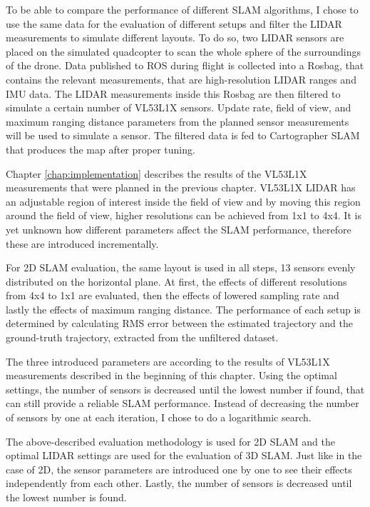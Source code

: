 To be able to compare the performance of different SLAM algorithms, I chose to use the same data for the evaluation of 
different setups and filter the LIDAR measurements to simulate different layouts. 
To do so, two LIDAR sensors are placed on the simulated quadcopter to scan the whole sphere of the 
surroundings of the drone. Data published to ROS during flight is collected into a Rosbag, that contains the relevant 
measurements, that are high-resolution LIDAR ranges and IMU data. The LIDAR measurements inside this Rosbag are then 
filtered to simulate a certain number of VL53L1X sensors. Update rate, field of view, and maximum ranging distance parameters
from the planned sensor measurements will be used to simulate a sensor. The filtered data is fed to Cartographer SLAM
that produces the map after proper tuning. 

Chapter \ref{chap:implementation} describes the results of the VL53L1X measurements that were planned in the previous chapter.
VL53L1X LIDAR has an adjustable region of interest inside the field of view and by moving this region around the field of view,
higher resolutions can be achieved from 1x1 to 4x4. It is yet unknown how different parameters affect the SLAM performance, 
therefore these are introduced incrementally. 

For 2D SLAM evaluation, the same layout is used in all steps, 13 sensors evenly distributed on the horizontal 
plane. At first, the effects of different resolutions from 4x4 to 1x1 are evaluated, then 
the effects of lowered sampling rate and lastly the effects of maximum ranging distance. The performance of each setup
is determined by calculating RMS error between the estimated trajectory and the ground-truth trajectory, extracted 
from the unfiltered dataset.

The three introduced parameters are according to the results of VL53L1X measurements described in the beginning of this chapter.
Using the optimal settings, the number of sensors is decreased until the lowest number if found, that can still provide a 
reliable SLAM performance. Instead of decreasing the number of sensors by one at each iteration, I chose
to do a logarithmic search.

The above-described evaluation methodology is used for 2D SLAM and the optimal LIDAR settings are used for the evaluation 
of 3D SLAM. Just like in the case of 2D, the sensor parameters are introduced one by one to see their effects independently 
from each other. Lastly, the number of sensors is decreased until the lowest number is found.
